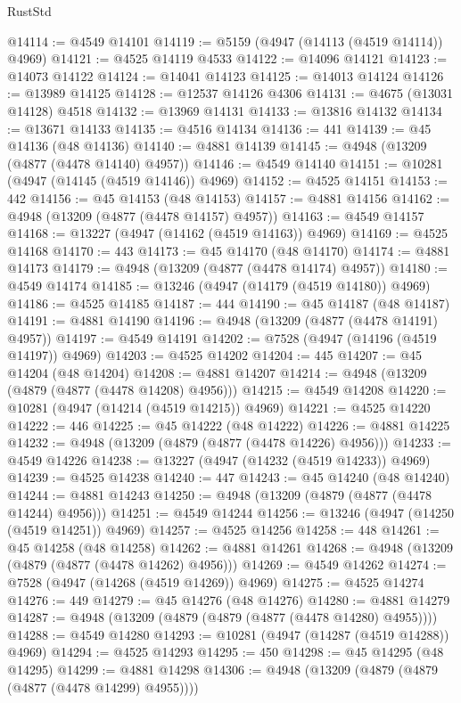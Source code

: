 \begin{lexlean}{RustStd}
\begin{coremodule}
@14114 := @4549 @14101
@14119 := @5159 (@4947 (@14113 (@4519 @14114)) @4969)
@14121 := @4525 @14119 @4533
@14122 := @14096 @14121
@14123 := @14073 @14122
@14124 := @14041 @14123
@14125 := @14013 @14124
@14126 := @13989 @14125
@14128 := @12537 @14126 @4306
@14131 := @4675 (@13031 @14128) @4518
@14132 := @13969 @14131
@14133 := @13816 @14132
@14134 := @13671 @14133
@14135 := @4516 @14134
@14136 := 441
@14139 := @45 @14136 (@48 @14136)
@14140 := @4881 @14139
@14145 := @4948 (@13209 (@4877 (@4478 @14140) @4957))
@14146 := @4549 @14140
@14151 := @10281 (@4947 (@14145 (@4519 @14146)) @4969)
@14152 := @4525 @14151
@14153 := 442
@14156 := @45 @14153 (@48 @14153)
@14157 := @4881 @14156
@14162 := @4948 (@13209 (@4877 (@4478 @14157) @4957))
@14163 := @4549 @14157
@14168 := @13227 (@4947 (@14162 (@4519 @14163)) @4969)
@14169 := @4525 @14168
@14170 := 443
@14173 := @45 @14170 (@48 @14170)
@14174 := @4881 @14173
@14179 := @4948 (@13209 (@4877 (@4478 @14174) @4957))
@14180 := @4549 @14174
@14185 := @13246 (@4947 (@14179 (@4519 @14180)) @4969)
@14186 := @4525 @14185
@14187 := 444
@14190 := @45 @14187 (@48 @14187)
@14191 := @4881 @14190
@14196 := @4948 (@13209 (@4877 (@4478 @14191) @4957))
@14197 := @4549 @14191
@14202 := @7528 (@4947 (@14196 (@4519 @14197)) @4969)
@14203 := @4525 @14202
@14204 := 445
@14207 := @45 @14204 (@48 @14204)
@14208 := @4881 @14207
@14214 := @4948 (@13209 (@4879 (@4877 (@4478 @14208) @4956)))
@14215 := @4549 @14208
@14220 := @10281 (@4947 (@14214 (@4519 @14215)) @4969)
@14221 := @4525 @14220
@14222 := 446
@14225 := @45 @14222 (@48 @14222)
@14226 := @4881 @14225
@14232 := @4948 (@13209 (@4879 (@4877 (@4478 @14226) @4956)))
@14233 := @4549 @14226
@14238 := @13227 (@4947 (@14232 (@4519 @14233)) @4969)
@14239 := @4525 @14238
@14240 := 447
@14243 := @45 @14240 (@48 @14240)
@14244 := @4881 @14243
@14250 := @4948 (@13209 (@4879 (@4877 (@4478 @14244) @4956)))
@14251 := @4549 @14244
@14256 := @13246 (@4947 (@14250 (@4519 @14251)) @4969)
@14257 := @4525 @14256
@14258 := 448
@14261 := @45 @14258 (@48 @14258)
@14262 := @4881 @14261
@14268 := @4948 (@13209 (@4879 (@4877 (@4478 @14262) @4956)))
@14269 := @4549 @14262
@14274 := @7528 (@4947 (@14268 (@4519 @14269)) @4969)
@14275 := @4525 @14274
@14276 := 449
@14279 := @45 @14276 (@48 @14276)
@14280 := @4881 @14279
@14287 := @4948 (@13209 (@4879 (@4879 (@4877 (@4478 @14280) @4955))))
@14288 := @4549 @14280
@14293 := @10281 (@4947 (@14287 (@4519 @14288)) @4969)
@14294 := @4525 @14293
@14295 := 450
@14298 := @45 @14295 (@48 @14295)
@14299 := @4881 @14298
@14306 := @4948 (@13209 (@4879 (@4879 (@4877 (@4478 @14299) @4955))))

\end{coremodule}
\end{lexlean}
